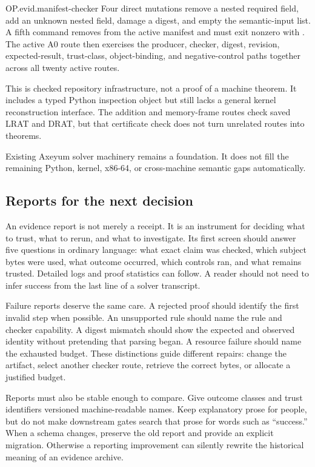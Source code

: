 \begin{artifact}{OP.evid.manifest-checker}
Four direct mutations remove a nested required field, add an unknown nested
field, damage a digest, and empty the semantic-input list. A fifth command
removes  from the active manifest and must exit
nonzero with . The active A0 route then exercises the
producer, checker, digest, revision, expected-result, trust-class, object-binding,
and negative-control paths together across all twenty active routes.

This is checked repository infrastructure, not a proof of a machine theorem.
It includes a typed Python inspection object but still lacks a general kernel
reconstruction interface. The addition and memory-frame routes check saved LRAT and DRAT,
but that certificate check does not turn unrelated routes into theorems.
\end{artifact}

Existing Axeyum solver machinery remains a foundation. It does not fill the
remaining Python, kernel, x86-64, or cross-machine semantic gaps automatically.
\label{op:manifest-checker}

\subsection{Reports for the next decision}

An evidence report is not merely a receipt. It is an instrument for deciding
what to trust, what to rerun, and what to investigate. Its first screen should
answer five questions in ordinary language: what exact claim was checked,
which subject bytes were used, what outcome occurred, which controls ran, and
what remains trusted. Detailed logs and proof statistics can follow. A reader
should not need to infer success from the last line of a solver transcript.

Failure reports deserve the same care. A rejected proof should identify the
first invalid step when possible. An unsupported rule should name the rule and
checker capability. A digest mismatch should show the expected and observed
identity without pretending that parsing began. A resource failure should
name the exhausted budget. These distinctions guide different repairs: change
the artifact, select another checker route, retrieve the correct bytes, or
allocate a justified budget.

Reports must also be stable enough to compare. Give outcome classes and trust
identifiers versioned machine-readable names. Keep explanatory prose for
people, but do not make downstream gates search that prose for words such as
``success.'' When a schema changes, preserve the old report and provide an
explicit migration. Otherwise a reporting improvement can silently rewrite
the historical meaning of an evidence archive.

